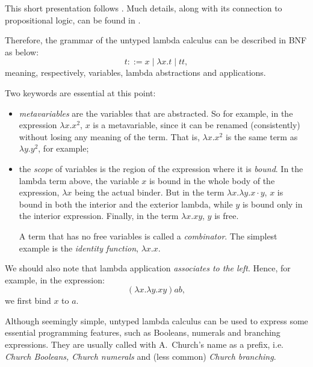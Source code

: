 This short presentation follows \cite[\S5]{tapl}. Much details, along
with its connection to propositional logic, can be found in
\cite{ch}.

Therefore, the grammar of the untyped lambda calculus can be described
in BNF as below:
\[
  t ::= x \mid \lambda x . t \mid t t,
\]
meaning, respectively, variables, lambda abstractions and applications.

Two keywords are essential at this point:
\begin{itemize}
\item \emph{metavariables} are the variables that are abstracted.
  So for example, in the expression $ \lambda x . x^2 $, $ x $ is
  a metavariable, since it can be renamed (consistently) without
  losing any meaning of the term. That is, $ \lambda x . x^2 $ is
  the same term as $ \lambda y . y^2 $, for example;
\item the \emph{scope} of variables is the region of the expression
  where it is \emph{bound}. In the lambda term above, the variable
  $ x $ is bound in the whole body of the expression, $ \lambda x $
  being the actual binder. But in the term
  $ \lambda x . \lambda y . x \cdot y $, $ x $ is bound
  in both the interior and the exterior lambda, while $ y $ is bound
  only in the interior expression. Finally, in the term
  $ \lambda x . xy $, $ y $ is free.

  A term that has no free variables is called a \emph{combinator}.
  The simplest example is the \emph{identity function},
  $ \lambda x . x $.
\end{itemize}

We should also note that lambda application \emph{associates to the left}.
Hence, for example, in the expression:
\[
  (\lambda x . \lambda y . xy)ab,
\]
we first bind $ x $ to $ a $.

Although seemingly simple, untyped lambda calculus can be used
to express some essential programming features, such as Booleans,
numerals and branching expressions. They are usually called with
A.\ Church's name as a prefix, i.e. \emph{Church Booleans, Church %
  numerals} and (less common) \emph{Church branching}.

